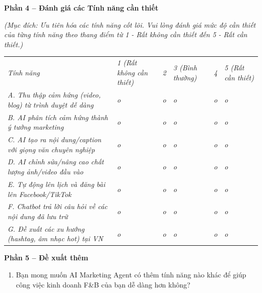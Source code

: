 \textbf{Phần 4 -- Đánh giá các Tính năng cần thiết}

\emph{(Mục đích: Ưu tiên hóa các tính năng cốt lõi. Vui lòng đánh giá
mức độ cần thiết của từng tính năng theo thang điểm từ 1 - Rất không cần
thiết đến 5 - Rất cần thiết.)}

{\def\LTcaptype{none} %
\begin{longtable}[]{@{}
  >{\centering\arraybackslash}p{}
  >{\centering\arraybackslash}p{}
  >{\centering\arraybackslash}p{}
  >{\centering\arraybackslash}p{}
  >{\centering\arraybackslash}p{}
  >{\centering\arraybackslash}p{}@{}}
\toprule\noalign{}
\endhead
\bottomrule\noalign{}
\endlastfoot
\emph{Tính năng} & \emph{1 (Rất không cần thiết)} & \emph{2} & \emph{3
(Bình thường)} & \emph{4} & \emph{5 (Rất cần thiết)} \\
\emph{A. Thu thập cảm hứng (video, blog) từ trình duyệt dễ dàng} &
\emph{o} & \emph{o} & \emph{o} & \emph{o} & \emph{o} \\
\emph{B. AI phân tích cảm hứng thành ý tưởng marketing} & \emph{o} &
\emph{o} & \emph{o} & \emph{o} & \emph{o} \\
\emph{C. AI tạo ra nội dung/caption với giọng văn chuyên nghiệp} &
\emph{o} & \emph{o} & \emph{o} & \emph{o} & \emph{o} \\
\emph{D. AI chỉnh sửa/nâng cao chất lượng ảnh/video đầu vào} & \emph{o}
& \emph{o} & \emph{o} & \emph{o} & \emph{o} \\
\emph{E. Tự động lên lịch và đăng bài lên Facebook/TikTok} & \emph{o} &
\emph{o} & \emph{o} & \emph{o} & \emph{o} \\
\emph{F. Chatbot trả lời câu hỏi về các nội dung đã lưu trữ} & \emph{o}
& \emph{o} & \emph{o} & \emph{o} & \emph{o} \\
\emph{G. Đề xuất các xu hướng (hashtag, âm nhạc hot) tại VN} & \emph{o}
& \emph{o} & \emph{o} & \emph{o} & \emph{o} \\
\end{longtable}
}

\textbf{Phần 5 -- Đề xuất thêm}

\begin{enumerate}
\def\labelenumi{\arabic{enumi}.}
\setcounter{enumi}{11}
\item
  Bạn mong muốn AI Marketing Agent có thêm tính năng nào khác để giúp
  công việc kinh doanh F\&B của bạn dễ dàng hơn không?
\end{enumerate}

